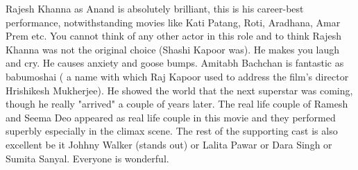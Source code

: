 \documentclass[11pt]{article}
\begin{document}
Rajesh Khanna as Anand is absolutely brilliant, this is his career-best performance, 
notwithstanding movies like Kati Patang, Roti, Aradhana, Amar Prem etc. You cannot think
of any other actor in this role and to think Rajesh Khanna was not the original choice 
(Shashi Kapoor was). He makes you laugh and cry. He causes anxiety and goose bumps. 
Amitabh Bachchan is fantastic as babumoshai ( a name with which Raj Kapoor used to address
the film's director Hrishikesh Mukherjee). He showed the world that the next superstar 
was coming, though he really "arrived" a couple of years later. The real life couple of
Ramesh and Seema Deo appeared as real life couple in this movie and they performed superbly
especially in the climax scene. The rest of the supporting cast is also excellent be it 
Johhny Walker (stands out) or Lalita Pawar or Dara Singh or Sumita Sanyal. Everyone is wonderful.
\end{document}
